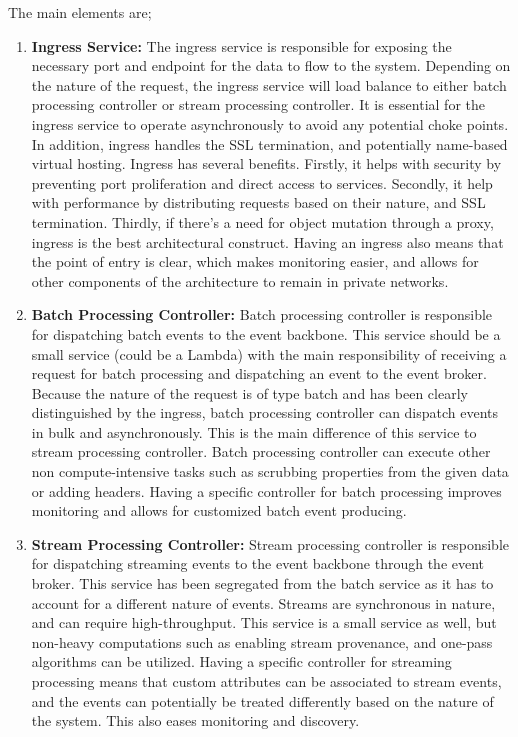\documentclass[review]{elsarticle}
\begin{document}
The main elements are;

\begin{enumerate}
    \item \textbf{Ingress Service:} The ingress service is responsible for exposing the necessary port and endpoint for the data to flow to the system. Depending on the nature of the request, the ingress service will load balance to either batch processing controller or stream processing controller. It is essential for the ingress service to operate asynchronously to avoid any potential choke points. In addition, ingress handles the SSL termination, and potentially name-based virtual hosting. Ingress has several benefits. Firstly, it helps with security by preventing port proliferation and direct access to services. Secondly, it help with performance by distributing requests based on their nature, and SSL termination. Thirdly, if there's a need for object mutation through a proxy, ingress is the best architectural construct. Having an ingress also means that the point of entry is clear, which makes monitoring easier, and allows for other components of the architecture to remain in private networks.
    \item \textbf{Batch Processing Controller:} Batch processing controller is responsible for dispatching batch events to the event backbone. This service should be a small service (could be a Lambda) with the main responsibility of receiving a request for batch processing and dispatching an event to the event broker. Because the nature of the request is of type batch and has been clearly distinguished by the ingress, batch processing controller can dispatch events in bulk and asynchronously. This is the main difference of this service to stream processing controller. Batch processing controller can execute other non compute-intensive tasks such as scrubbing properties from the given data or adding headers. Having a specific controller for batch processing improves monitoring and allows for customized batch event producing.
    \item \textbf{Stream Processing Controller:} Stream processing controller is responsible for dispatching streaming events to the event backbone through the event broker. This service has been segregated from the batch service as it has to account for a different nature of events. Streams are synchronous in nature, and can require high-throughput. This service is a small service as well, but non-heavy computations such as enabling stream provenance, and one-pass algorithms can be utilized. Having a specific controller for streaming processing means that custom attributes can be associated to stream events, and the events can potentially be treated differently based on the nature of the system. This also eases monitoring and discovery.

\end{enumerate}
\end{document}
